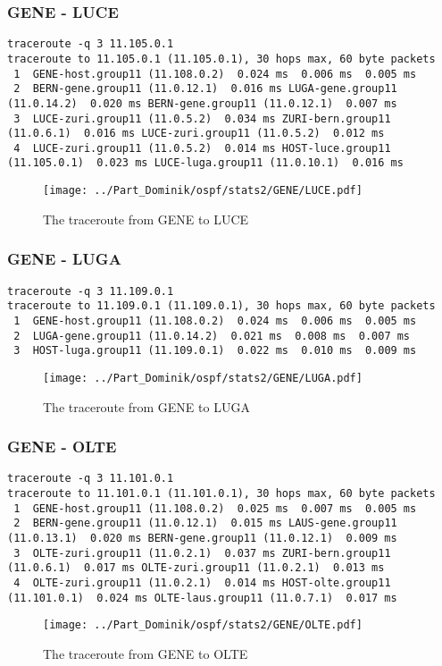 \subsubsection{GENE - LUCE}
\begin{lstlisting}
traceroute -q 3 11.105.0.1
traceroute to 11.105.0.1 (11.105.0.1), 30 hops max, 60 byte packets
 1  GENE-host.group11 (11.108.0.2)  0.024 ms  0.006 ms  0.005 ms
 2  BERN-gene.group11 (11.0.12.1)  0.016 ms LUGA-gene.group11 (11.0.14.2)  0.020 ms BERN-gene.group11 (11.0.12.1)  0.007 ms
 3  LUCE-zuri.group11 (11.0.5.2)  0.034 ms ZURI-bern.group11 (11.0.6.1)  0.016 ms LUCE-zuri.group11 (11.0.5.2)  0.012 ms
 4  LUCE-zuri.group11 (11.0.5.2)  0.014 ms HOST-luce.group11 (11.105.0.1)  0.023 ms LUCE-luga.group11 (11.0.10.1)  0.016 ms
\end{lstlisting}
\begin{figure}[H]
\centering
\texttt{[image: ../Part\_Dominik/ospf/stats2/GENE/LUCE.pdf]}
\caption{The traceroute from GENE to LUCE}
\end{figure}
\clearpage
\subsubsection{GENE - LUGA}
\begin{lstlisting}
traceroute -q 3 11.109.0.1
traceroute to 11.109.0.1 (11.109.0.1), 30 hops max, 60 byte packets
 1  GENE-host.group11 (11.108.0.2)  0.024 ms  0.006 ms  0.005 ms
 2  LUGA-gene.group11 (11.0.14.2)  0.021 ms  0.008 ms  0.007 ms
 3  HOST-luga.group11 (11.109.0.1)  0.022 ms  0.010 ms  0.009 ms
\end{lstlisting}
\begin{figure}[H]
\centering
\texttt{[image: ../Part\_Dominik/ospf/stats2/GENE/LUGA.pdf]}
\caption{The traceroute from GENE to LUGA}
\end{figure}
\clearpage
\subsubsection{GENE - OLTE}
\begin{lstlisting}
traceroute -q 3 11.101.0.1
traceroute to 11.101.0.1 (11.101.0.1), 30 hops max, 60 byte packets
 1  GENE-host.group11 (11.108.0.2)  0.025 ms  0.007 ms  0.005 ms
 2  BERN-gene.group11 (11.0.12.1)  0.015 ms LAUS-gene.group11 (11.0.13.1)  0.020 ms BERN-gene.group11 (11.0.12.1)  0.009 ms
 3  OLTE-zuri.group11 (11.0.2.1)  0.037 ms ZURI-bern.group11 (11.0.6.1)  0.017 ms OLTE-zuri.group11 (11.0.2.1)  0.013 ms
 4  OLTE-zuri.group11 (11.0.2.1)  0.014 ms HOST-olte.group11 (11.101.0.1)  0.024 ms OLTE-laus.group11 (11.0.7.1)  0.017 ms
\end{lstlisting}
\begin{figure}[H]
\centering
\texttt{[image: ../Part\_Dominik/ospf/stats2/GENE/OLTE.pdf]}
\caption{The traceroute from GENE to OLTE}
\end{figure}
\clearpage
